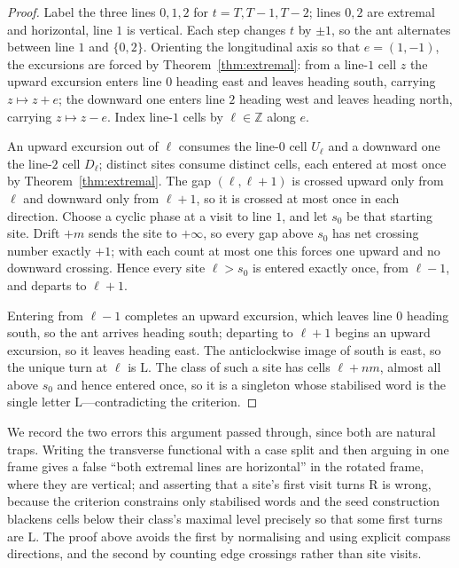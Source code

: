 \documentclass[11pt,reqno]{amsart}
\theoremstyle{plain}
\theoremstyle{definition}
\newcommand{\Z}{\mathbb{Z}}
\newcommand{\turnR}{\mathrm{R}}
\newcommand{\turnL}{\mathrm{L}}
\begin{document}
\begin{proof}
Label the three lines $0,1,2$ for $t=T,T-1,T-2$; lines $0,2$ are extremal and
horizontal, line $1$ is vertical. Each step changes $t$ by $\pm1$, so the ant
alternates between line $1$ and $\{0,2\}$. Orienting the longitudinal axis so that
$e=(1,-1)$, the excursions are forced by Theorem~\ref{thm:extremal}: from a line-$1$
cell $z$ the upward excursion enters line $0$ heading east and leaves heading south,
carrying $z\mapsto z+e$; the downward one enters line $2$ heading west and leaves
heading north, carrying $z\mapsto z-e$. Index line-$1$ cells by $\ell\in\Z$ along $e$.

An upward excursion out of $\ell$ consumes the line-$0$ cell $U_\ell$ and a downward
one the line-$2$ cell $D_\ell$; distinct sites consume distinct cells, each entered at
most once by Theorem~\ref{thm:extremal}. The gap $(\ell,\ell+1)$ is crossed upward
only from $\ell$ and downward only from $\ell+1$, so it is crossed at most once in
each direction. Choose a cyclic phase at a visit to line $1$, and let $s_0$ be that
starting site. Drift $+m$ sends the site to
$+\infty$, so every gap above $s_0$ has net crossing number exactly $+1$; with each
count at most one this forces one upward and no downward crossing. Hence every site
$\ell>s_0$ is entered exactly once, from $\ell-1$, and departs to $\ell+1$.

Entering from $\ell-1$ completes an upward excursion, which leaves line $0$ heading
south, so the ant arrives heading south; departing to $\ell+1$ begins an upward
excursion, so it leaves heading east. The anticlockwise image of south is east, so the
unique turn at $\ell$ is $\turnL$. The class of such a site has cells $\ell+nm$, almost
all above $s_0$ and hence entered once, so it is a singleton whose stabilised word is
the single letter $\turnL$---contradicting the criterion. \end{proof}

We record the two errors this argument passed through, since both are natural traps.
Writing the transverse functional with a case split and then arguing in one frame gives
a false ``both extremal lines are horizontal'' in the rotated frame, where they are
vertical; and asserting that a site's first visit turns $\turnR$ is wrong, because the
criterion constrains only stabilised words and the seed construction blackens cells
below their class's maximal level precisely so that some first turns are $\turnL$. The
proof above avoids the first by normalising and using explicit compass directions, and
the second by counting edge crossings rather than site visits.
\end{document}
